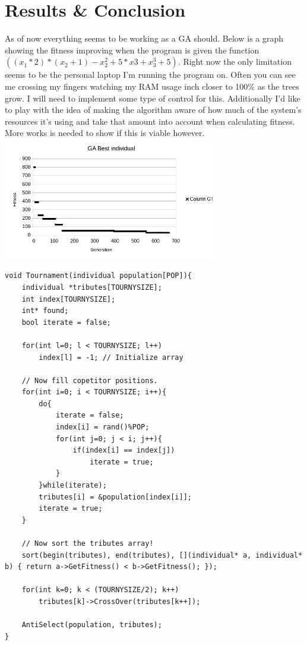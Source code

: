 \documentclass[twocolumn]{article}
\begin{document}
\section{Results \& Conclusion}
As of now everything seems to be working as a GA should. Below is a graph showing the fitness improving when the program is given the function $((x_1 * 2)*(x_2+1) - x_2^2 + 5*x3 +x_3^3 +5)$. Right now the only limitation seems to be the personal laptop I'm running the program on. Often you can see me crossing my fingers watching my RAM usage inch closer to 100\% as the trees grow. I will need to implement some type of control for this. Additionally I'd like to play with the idea of making the algorithm aware of how much of the system's resources it's using and take that amount into account when calculating fitness. More works is needed to show if this is viable however.
\includegraphics[width=9.5cm]{graph.png}

\pagebreak
\onecolumn
\begin{lstlisting}[frame=single]
void Tournament(individual population[POP]){
	individual *tributes[TOURNYSIZE];
	int index[TOURNYSIZE];
	int* found;
	bool iterate = false;

	for(int l=0; l < TOURNYSIZE; l++)
		index[l] = -1; // Initialize array

	// Now fill copetitor positions.
	for(int i=0; i < TOURNYSIZE; i++){
		do{
			iterate = false;
			index[i] = rand()%POP;
			for(int j=0; j < i; j++){
				if(index[i] == index[j])
					iterate = true;
			}
		}while(iterate);
		tributes[i] = &population[index[i]];
		iterate = true;
	}

	// Now sort the tributes array!
	sort(begin(tributes), end(tributes), [](individual* a, individual* b) { return a->GetFitness() < b->GetFitness(); });

	for(int k=0; k < (TOURNYSIZE/2); k++)
		tributes[k]->CrossOver(tributes[k++]);

	AntiSelect(population, tributes);
}
\end{lstlisting}
\end{document}
